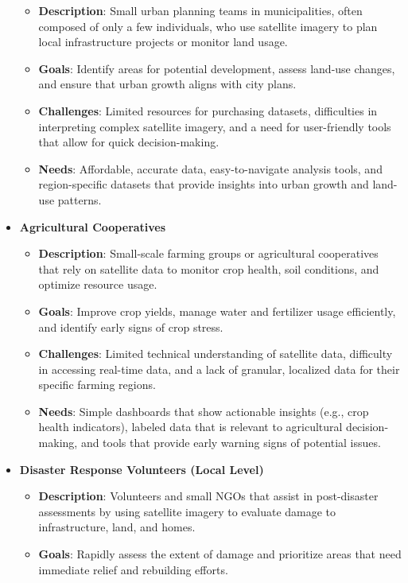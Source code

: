 \documentclass[12pt]{article}
\begin{document}
\begin{itemize}
    \begin{itemize}
        \item \textbf{Description}: Small urban planning teams in municipalities, often composed of only a few individuals, who use satellite imagery to plan local infrastructure projects or monitor land usage.
        \item \textbf{Goals}: Identify areas for potential development, assess land-use changes, and ensure that urban growth aligns with city plans.
        \item \textbf{Challenges}: Limited resources for purchasing datasets, difficulties in interpreting complex satellite imagery, and a need for user-friendly tools that allow for quick decision-making.
        \item \textbf{Needs}: Affordable, accurate data, easy-to-navigate analysis tools, and region-specific datasets that provide insights into urban growth and land-use patterns.
    \end{itemize}
    \item \textbf{Agricultural Cooperatives}
    \begin{itemize}
        \item \textbf{Description}: Small-scale farming groups or agricultural cooperatives that rely on satellite data to monitor crop health, soil conditions, and optimize resource usage.
        \item \textbf{Goals}: Improve crop yields, manage water and fertilizer usage efficiently, and identify early signs of crop stress.
        \item \textbf{Challenges}: Limited technical understanding of satellite data, difficulty in accessing real-time data, and a lack of granular, localized data for their specific farming regions.
        \item \textbf{Needs}: Simple dashboards that show actionable insights (e.g., crop health indicators), labeled data that is relevant to agricultural decision-making, and tools that provide early warning signs of potential issues.
    \end{itemize}
    \item \textbf{Disaster Response Volunteers (Local Level)}
    \begin{itemize}
        \item \textbf{Description}: Volunteers and small NGOs that assist in post-disaster assessments by using satellite imagery to evaluate damage to infrastructure, land, and homes.
        \item \textbf{Goals}: Rapidly assess the extent of damage and prioritize areas that need immediate relief and rebuilding efforts.

\end{itemize}
\end{itemize}
\end{document}
